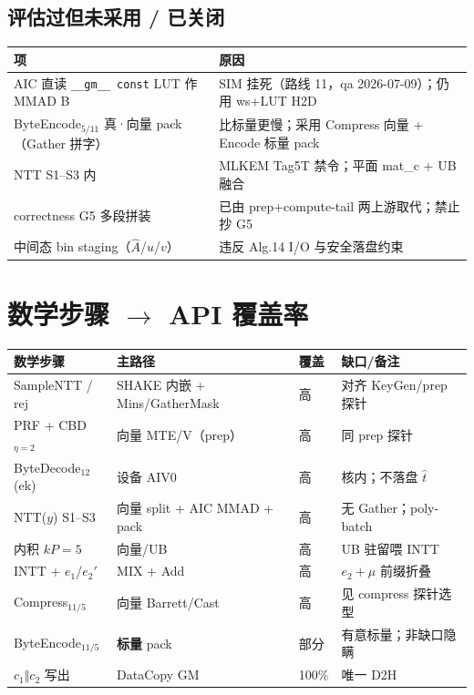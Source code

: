\documentclass[UTF8,a4paper,11pt]{ctexart}
\newcommand{\apiname}[1]{\texttt{\seqsplit{#1}}}
\begin{document}
\subsection{评估过但未采用 / 已关闭}

\begin{longtable}{@{}L{4.5cm}L{8.5cm}@{}}
\toprule
项 & 原因 \\
\midrule
AIC 直读 \texttt{\_\_gm\_\_ const} LUT 作 MMAD B & SIM 挂死（路线 11，qa 2026-07-09）；仍用 ws+LUT H2D \\
ByteEncode$_{5/11}$ 真·向量 pack（Gather 拼字） & 比标量更慢；采用 Compress 向量 + Encode 标量 pack \\
NTT S1--S3 内 \apiname{Gather} & MLKEM Tag5T 禁令；平面 mat\_c + UB 融合 \\
correctness G5 多段拼装 & 已由 prep+compute-tail 两上游取代；禁止抄 G5 \\
中间态 bin staging（$\hat{A}$/$u$/$v$） & 违反 Alg.14 I/O 与安全落盘约束 \\
\bottomrule
\end{longtable}

\section{数学步骤 $\to$ API 覆盖率}
\label{sec:coverage}

\begin{longtable}{@{}L{4.2cm}L{4.0cm}L{1.5cm}L{3.5cm}@{}}
\toprule
数学步骤 & 主路径 & 覆盖 & 缺口/备注 \\
\midrule
SampleNTT / rej & SHAKE 内嵌 + Mins/GatherMask & 高 & 对齐 KeyGen/prep 探针 \\
PRF + CBD$_{\eta=2}$ & 向量 MTE/V（prep） & 高 & 同 prep 探针 \\
ByteDecode$_{12}$(ek) & 设备 AIV0 & 高 & 核内；不落盘 $\hat{t}$ \\
NTT($y$) S1--S3 & 向量 split + AIC MMAD + pack & 高 & 无 Gather；poly-batch \\
内积 $kP{=}5$ & 向量/UB & 高 & UB 驻留喂 INTT \\
INTT + $e_1$/$e_2'$ & MIX + Add & 高 & $e_2{+}\mu$ 前缀折叠 \\
Compress$_{11/5}$ & 向量 Barrett/Cast & 高 & 见 compress 探针选型 \\
ByteEncode$_{11/5}$ & \textbf{标量} pack & 部分 & 有意标量；非缺口隐瞒 \\
$c_1\Vert c_2$ 写出 & DataCopy GM & 100\% & 唯一 D2H \\
\bottomrule
\end{longtable}
\end{document}
